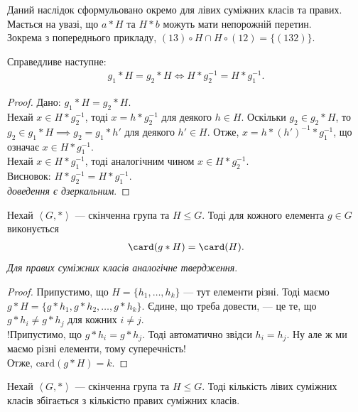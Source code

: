 \documentclass{math_library}
\begin{document}
\begin{remark}
Даний наслідок сформульовано окремо для лівих суміжних класів та правих. Мається на увазі, що $a*H$ та $H*b$ можуть мати непорожній перетин.
\bigskip \\
Зокрема з попереднього прикладу, $(13) \circ H \cap H \circ (12) = \{(132)\}$.
\end{remark}

\begin{proposition}
Справедливе наступне:
\begin{align*}
g_1 * H = g_2 * H \iff H * g_2^{-1} = H * g_1^{-1}.
\end{align*}
\end{proposition}

\begin{proof}
\rightproof Дано: $g_1 * H = g_2 * H$.\\
Нехай $x \in H*g_2^{-1}$, тоді $x = h*g_2^{-1}$ для деякого $h \in H$. Оскільки $g_2 \in g_2*H$, то $g_2 \in g_1*H \implies g_2 = g_1*h'$ для деякого $h' \in H$. Отже, $x = h*(h')^{-1}*g_1^{-1}$, що означає $x \in H*g_1^{-1}$.\\
Нехай $x \in H*g_1^{-1}$, тоді аналогічним чином $x \in H*g_2^{-1}$.\\
Висновок: $H*g_2^{-1} = H*g_1^{-1}$.
\bigskip \\
\leftproof \textit{доведення є дзеркальним}.
\end{proof}

\begin{proposition}
\label{card_g_times_H_equals_card_H}
Нехай $\left<G,* \right>$ --- скінченна група та $H \leq G$. Тоді для кожного елемента $g \in G$ виконується 
\begin{align*}
\card(g*H) = \card(H).
\end{align*}
\textit{Для правих суміжних класів аналогічне твердження}.
\end{proposition}

\begin{proof}
Припустимо, що $H = \{h_1,\dots,h_k\}$ --- тут елементи різні. Тоді маємо $g*H = \{g*h_1,g*h_2,\dots,g*h_k\}$.  Єдине, що треба довести, --- це те, що $g*h_i \neq g*h_j$ для кожних $i \neq j$.\\
!Припустимо, що $g*h_i = g*h_j$. Тоді автоматично звідси $h_i = h_j$. Ну але ж ми маємо різні елементи, тому суперечність!\\
Отже, $\text{card}(g*H) = k$.
\end{proof}

\begin{proposition}
Нехай $\left< G, * \right>$ --- скінченна група та $H \leq G$. Тоді кількість лівих суміжних класів збігається з кількістю правих суміжних класів.
\end{proposition}
\end{document}
